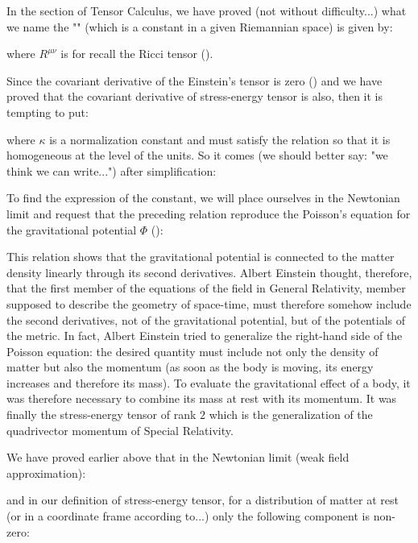 	In the section of Tensor Calculus, we have proved (not without difficulty...) what we name the "" (which is a constant in a given Riemannian space) is given by:
	
	where $R^{\mu\nu}$ is for recall the Ricci tensor ().

	Since the covariant derivative of the Einstein's tensor is zero () and we have proved that the covariant derivative of stress-energy tensor is also, then it is tempting to put:
	
	where $\kappa$ is a normalization constant and must satisfy the relation so that it is homogeneous at the level of the units. So it comes (we should better say: "we think we can write...") after simplification:
	
	To find the expression of the constant, we will place ourselves in the Newtonian limit and request that the preceding relation reproduce the Poisson's equation for the gravitational potential $\Phi$ ():
	
	\begin{tcolorbox}[title=Remark,colframe=black,arc=10pt]
	This relation shows that the gravitational potential is connected to the matter density linearly through its second derivatives. Albert Einstein thought, therefore, that the first member of the equations of the field in General Relativity, member supposed to describe the geometry of space-time, must therefore somehow include the second derivatives, not of the gravitational potential, but of the potentials of the metric. In fact, Albert Einstein tried to generalize the right-hand side of the Poisson equation: the desired quantity must include not only the density of matter but also the momentum (as soon as the body is moving, its energy increases and therefore its mass). To evaluate the gravitational effect of a body, it was therefore necessary to combine its mass at rest with its momentum. It was finally the stress-energy tensor of rank $2$ which is the generalization of the quadrivector momentum of Special Relativity.
	\end{tcolorbox}
	We have proved earlier above that in the Newtonian limit (weak field approximation):
	
	and in our definition of stress-energy tensor, for a distribution of matter at rest (or in a coordinate frame according to...) only the following component is non-zero:
	
